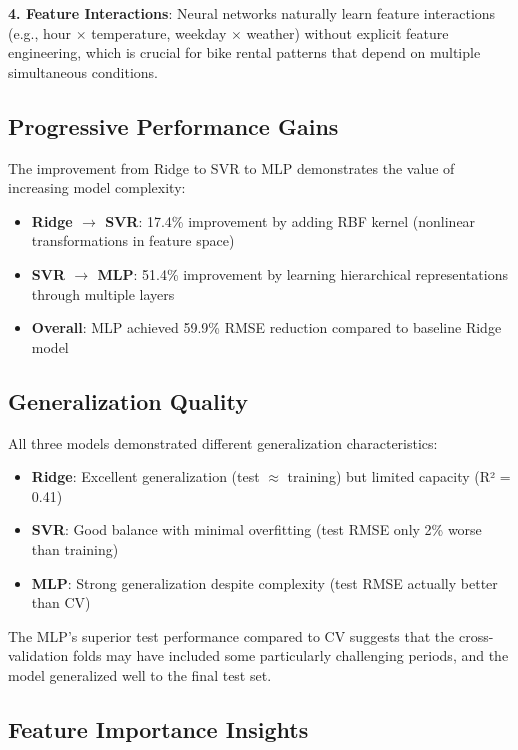 \documentclass[conference]{IEEEtran}
\begin{document}
\textbf{4. Feature Interactions}: Neural networks naturally learn feature interactions (e.g., hour $\times$ temperature, weekday $\times$ weather) without explicit feature engineering, which is crucial for bike rental patterns that depend on multiple simultaneous conditions.

\subsection{Progressive Performance Gains}

The improvement from Ridge to SVR to MLP demonstrates the value of increasing model complexity:
\begin{itemize}
    \item \textbf{Ridge $\rightarrow$ SVR}: 17.4\% improvement by adding RBF kernel (nonlinear transformations in feature space)
    \item \textbf{SVR $\rightarrow$ MLP}: 51.4\% improvement by learning hierarchical representations through multiple layers
    \item \textbf{Overall}: MLP achieved 59.9\% RMSE reduction compared to baseline Ridge model
\end{itemize}

\subsection{Generalization Quality}

All three models demonstrated different generalization characteristics:
\begin{itemize}
    \item \textbf{Ridge}: Excellent generalization (test $\approx$ training) but limited capacity (R² = 0.41)
    \item \textbf{SVR}: Good balance with minimal overfitting (test RMSE only 2\% worse than training)
    \item \textbf{MLP}: Strong generalization despite complexity (test RMSE actually better than CV)
\end{itemize}

The MLP's superior test performance compared to CV suggests that the cross-validation folds may have included some particularly challenging periods, and the model generalized well to the final test set.

\subsection{Feature Importance Insights}
\end{document}

